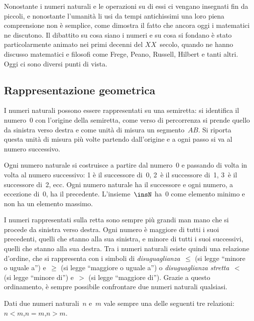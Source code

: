 Nonostante i numeri naturali e le operazioni su di essi ci vengano insegnati fin da
piccoli, e nonostante l'umanità li usi da tempi antichissimi una loro piena comprensione
non è semplice, come dimostra il fatto che ancora oggi i matematici ne discutono. Il
dibattito su cosa siano i numeri e su cosa si fondano è stato particolarmente animato nei
primi decenni del $XX$~secolo, quando ne hanno discusso matematici e filosofi come Frege,
Peano, Russell, Hilbert e tanti altri. Oggi ci sono diversi punti di vista.

\subsection{Rappresentazione geometrica}
I numeri naturali possono essere rappresentati su una semiretta: si identifica il numero~0
con l'origine della semiretta, come verso di percorrenza si prende quello da sinistra
verso destra e come unità di misura un segmento~$AB$. Si riporta questa unità di misura
più volte partendo dall'origine e a ogni passo si va al numero successivo.
\begin{center}
 
\end{center}


Ogni numero naturale si costruisce a partire dal numero~0 e passando di volta in volta al
numero successivo: 1 è il successore di~0, 2~è il successore di~1, 3~è il successore di~2,
ecc. Ogni numero naturale ha il successore e ogni numero, a eccezione di~0, ha il
precedente. L'insieme~$\insN$ ha~0 come elemento minimo e non ha un elemento massimo.

I numeri rappresentati sulla retta sono sempre più grandi man mano che si procede da
sinistra verso destra. Ogni numero è maggiore di tutti i suoi precedenti, quelli che
stanno alla sua sinistra, e minore di tutti i suoi successivi, quelli che stanno alla sua
destra. Tra i numeri naturali esiste quindi una relazione d'ordine, che si rappresenta con i simboli di
\emph{disuguaglianza}~$\le$ (si legge ``minore o uguale a'') e~$\ge$ (si legge ``maggiore o uguale a'') o \emph{disuguaglianza stretta}~$<$ (si legge ``minore di'') e~$>$ (si legge ``maggiore di'').
Grazie a questo ordinamento, è sempre possibile confrontare due numeri naturali qualsiasi.

\begin{legge}[di tricotomia]
Dati due numeri naturali~$n$ e~$m$ vale sempre una delle seguenti tre relazioni: \quad $n<m$,\quad $n=m$,\quad $n>m$.
\end{legge}

